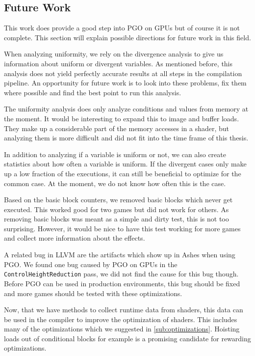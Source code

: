 \subsection{Future Work}
\label{sub:futurework}
This work does provide a good step into PGO on GPUs but of course it is not complete.
This section will explain possible directions for future work in this field.

When analyzing uniformity, we rely on the divergence analysis to give us information about uniform or divergent variables.
As mentioned before, this analysis does not yield perfectly accurate results at all steps in the compilation pipeline.
An opportunity for future work is to look into these problems, fix them where possible and find the best point to run this analysis.

The uniformity analysis does only analyze conditions and values from memory at the moment.
It would be interesting to expand this to image and buffer loads.
They make up a considerable part of the memory accesses in a shader, but analyzing them is more difficult and did not fit into the time frame of this thesis.

In addition to analyzing if a variable is uniform or not, we can also create statistics about how often a variable is uniform.
If the divergent cases only make up a low fraction of the executions, it can still be beneficial to optimize for the common case.
At the moment, we do not know how often this is the case.

Based on the basic block counters, we removed basic blocks which never get executed.
This worked good for two games but did not work for others.
As removing basic blocks was meant as a simple and dirty test, this is not too surprising.
However, it would be nice to have this test working for more games and collect more information about the effects.

A related bug in LLVM are the artifacts which show up in Ashes when using PGO.
We found one bug caused by PGO on GPUs in the \texttt{ControlHeightReduction} pass, we did not find the cause for this bug though.
Before PGO can be used in production environments, this bug should be fixed and more games should be tested with these optimizations.

Now, that we have methods to collect runtime data from shaders, this data can be used in the compiler to improve the optimization of shaders.
This includes many of the optimizations which we suggested in \cref{sub:optimizations}.
Hoisting loads out of conditional blocks for example is a promising candidate for rewarding optimizations.

